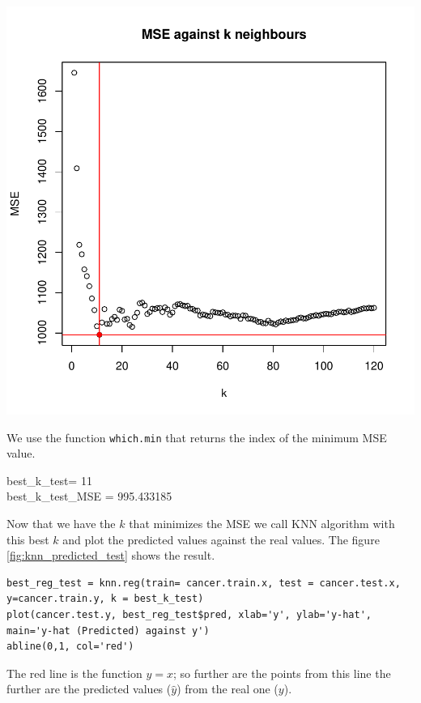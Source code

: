 \documentclass[]{report}
\begin{document}
\begin{center}	
		\includegraphics[width=0.9\linewidth]{Figures/knn_test.pdf}
		\label{fig:knn_test}
\end{center}

 We use the function \texttt{which.min} that returns the index of the minimum MSE value.\\

\begin{center} 
	best\_k\_test= 11 \\
	best\_k\_test\_MSE = 995.433185
\end{center}

Now that we have the $k$ that minimizes the MSE we call KNN algorithm with this best $k$ and plot the predicted values against the real values. The figure \ref{fig:knn_predicted_test} shows the result.

\begin{lstlisting}
best_reg_test = knn.reg(train= cancer.train.x, test = cancer.test.x, y=cancer.train.y, k = best_k_test)
plot(cancer.test.y, best_reg_test$pred, xlab='y', ylab='y-hat', main='y-hat (Predicted) against y')
abline(0,1, col='red')
\end{lstlisting}

The red line is the function $y=x$; so further are the points from this line the further are the predicted values ($\hat{y}$) from the real one ($y$).
	
\end{document}
